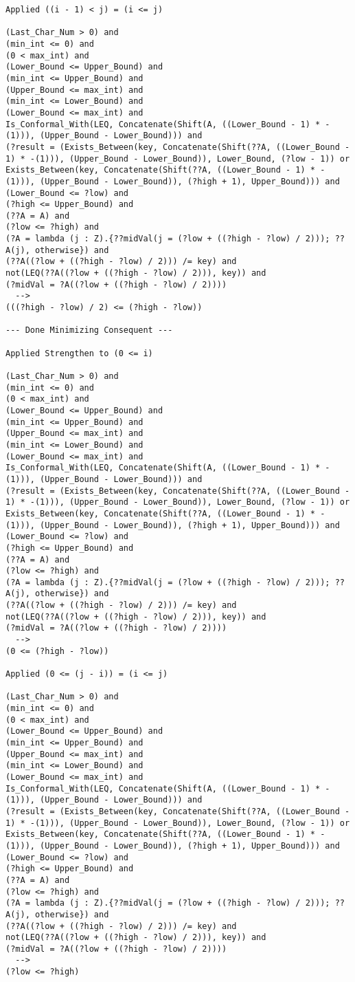 \begin{lstlisting}[language=resolve]
Applied ((i - 1) < j) = (i <= j)

(Last_Char_Num > 0) and
(min_int <= 0) and
(0 < max_int) and
(Lower_Bound <= Upper_Bound) and
(min_int <= Upper_Bound) and
(Upper_Bound <= max_int) and
(min_int <= Lower_Bound) and
(Lower_Bound <= max_int) and
Is_Conformal_With(LEQ, Concatenate(Shift(A, ((Lower_Bound - 1) * -(1))), (Upper_Bound - Lower_Bound))) and
(?result = (Exists_Between(key, Concatenate(Shift(??A, ((Lower_Bound - 1) * -(1))), (Upper_Bound - Lower_Bound)), Lower_Bound, (?low - 1)) or Exists_Between(key, Concatenate(Shift(??A, ((Lower_Bound - 1) * -(1))), (Upper_Bound - Lower_Bound)), (?high + 1), Upper_Bound))) and
(Lower_Bound <= ?low) and
(?high <= Upper_Bound) and
(??A = A) and
(?low <= ?high) and
(?A = lambda (j : Z).{??midVal(j = (?low + ((?high - ?low) / 2))); ??A(j), otherwise}) and
(??A((?low + ((?high - ?low) / 2))) /= key) and
not(LEQ(??A((?low + ((?high - ?low) / 2))), key)) and
(?midVal = ?A((?low + ((?high - ?low) / 2))))
  -->
(((?high - ?low) / 2) <= (?high - ?low))

--- Done Minimizing Consequent ---

Applied Strengthen to (0 <= i)

(Last_Char_Num > 0) and
(min_int <= 0) and
(0 < max_int) and
(Lower_Bound <= Upper_Bound) and
(min_int <= Upper_Bound) and
(Upper_Bound <= max_int) and
(min_int <= Lower_Bound) and
(Lower_Bound <= max_int) and
Is_Conformal_With(LEQ, Concatenate(Shift(A, ((Lower_Bound - 1) * -(1))), (Upper_Bound - Lower_Bound))) and
(?result = (Exists_Between(key, Concatenate(Shift(??A, ((Lower_Bound - 1) * -(1))), (Upper_Bound - Lower_Bound)), Lower_Bound, (?low - 1)) or Exists_Between(key, Concatenate(Shift(??A, ((Lower_Bound - 1) * -(1))), (Upper_Bound - Lower_Bound)), (?high + 1), Upper_Bound))) and
(Lower_Bound <= ?low) and
(?high <= Upper_Bound) and
(??A = A) and
(?low <= ?high) and
(?A = lambda (j : Z).{??midVal(j = (?low + ((?high - ?low) / 2))); ??A(j), otherwise}) and
(??A((?low + ((?high - ?low) / 2))) /= key) and
not(LEQ(??A((?low + ((?high - ?low) / 2))), key)) and
(?midVal = ?A((?low + ((?high - ?low) / 2))))
  -->
(0 <= (?high - ?low))

Applied (0 <= (j - i)) = (i <= j)

(Last_Char_Num > 0) and
(min_int <= 0) and
(0 < max_int) and
(Lower_Bound <= Upper_Bound) and
(min_int <= Upper_Bound) and
(Upper_Bound <= max_int) and
(min_int <= Lower_Bound) and
(Lower_Bound <= max_int) and
Is_Conformal_With(LEQ, Concatenate(Shift(A, ((Lower_Bound - 1) * -(1))), (Upper_Bound - Lower_Bound))) and
(?result = (Exists_Between(key, Concatenate(Shift(??A, ((Lower_Bound - 1) * -(1))), (Upper_Bound - Lower_Bound)), Lower_Bound, (?low - 1)) or Exists_Between(key, Concatenate(Shift(??A, ((Lower_Bound - 1) * -(1))), (Upper_Bound - Lower_Bound)), (?high + 1), Upper_Bound))) and
(Lower_Bound <= ?low) and
(?high <= Upper_Bound) and
(??A = A) and
(?low <= ?high) and
(?A = lambda (j : Z).{??midVal(j = (?low + ((?high - ?low) / 2))); ??A(j), otherwise}) and
(??A((?low + ((?high - ?low) / 2))) /= key) and
not(LEQ(??A((?low + ((?high - ?low) / 2))), key)) and
(?midVal = ?A((?low + ((?high - ?low) / 2))))
  -->
(?low <= ?high)


\end{lstlisting}
